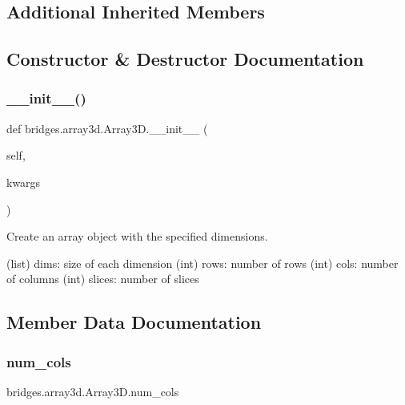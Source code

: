 \subsection*{Additional Inherited Members}


\subsection{Constructor \& Destructor Documentation}
\mbox{\label{classbridges_1_1array3d_1_1_array3_d_a2ab3261c784068e2b4fdf388a972b1e3}} 
\subsubsection{\texorpdfstring{\+\_\+\+\_\+init\+\_\+\+\_\+()}{\_\_init\_\_()}}
{\footnotesize\ttfamily def bridges.\+array3d.\+Array3\+D.\+\_\+\+\_\+init\+\_\+\+\_\+ (\begin{DoxyParamCaption}\item[{}]{self,  }\item[{}]{kwargs }\end{DoxyParamCaption})}



Create an array object with the specified dimensions. 

(list) dims\+: size of each dimension (int) rows\+: number of rows (int) cols\+: number of columns (int) slices\+: number of slices 

\subsection{Member Data Documentation}
\mbox{\label{classbridges_1_1array3d_1_1_array3_d_a94ce27f39ece55011ba1f7e69789b922}} 
\subsubsection{\texorpdfstring{num\+\_\+cols}{num\_cols}}
{\footnotesize\ttfamily bridges.\+array3d.\+Array3\+D.\+num\+\_\+cols}

